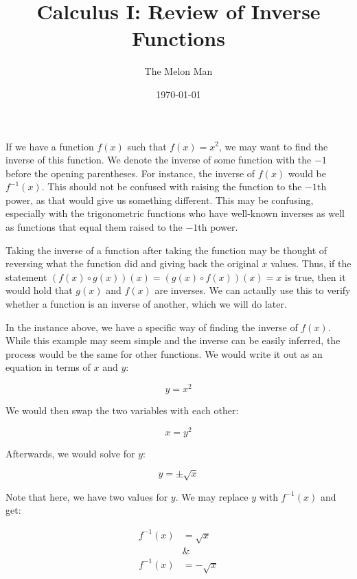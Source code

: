 \documentclass[12pt]{article}
\title{Calculus I: Review of Inverse Functions}
\author{The Melon Man}
\date{\today}
\begin{document}
\maketitle

If we have a function $f(x)$ such that $f(x)=x^2$, we may want to find the inverse of this function.
We denote the inverse of some function with the $-1$ before the opening parentheses.
For instance, the inverse of $f(x)$ would be $f^{-1}(x)$.
This should not be confused with raising the function to the $-1$th power, as that would give us something different.
This may be confusing, especially with the trigonometric functions who have well-known inverses as well as functions that equal them raised to the $-1$th power.

Taking the inverse of a function after taking the function may be thought of reversing what the function did and giving back the original $x$ values.
Thus, if the statement $(f(x) \circ g(x))(x) = (g(x) \circ f(x))(x) = x$ is true, then it would hold that $g(x)$ and $f(x)$ are inverses.
We can actaully use this to verify whether a function is an inverse of another, which we will do later.

In the instance above, we have a specific way of finding the inverse of $f(x)$.
While this example may seem simple and the inverse can be easily inferred, the process would be the same for other functions.
We would write it out as an equation in terms of $x$ and $y$:

\begin{equation}
    y = x^2
\end{equation}

We would then swap the two variables with each other:

\begin{equation}
    x = y^2
\end{equation}

Afterwards, we would solve for $y$:

\begin{equation}
    y = \pm \sqrt{x}
\end{equation}

Note that here, we have two values for $y$.
We may replace $y$ with $f^{-1}(x)$ and get:

\begin{align}
    f^{-1}(x) & = \sqrt{x}  \\
              & \&          \\
    f^{-1}(x) & = -\sqrt{x}
\end{align}
\end{document}
